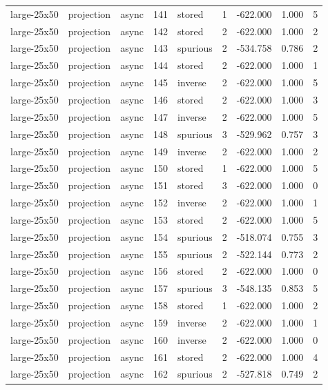 \begin{tabular}{lllrlrrrr}
large-25x50 & projection & async & 141 & stored & 1 & -622.000 & 1.000 & 5 \\
large-25x50 & projection & async & 142 & stored & 2 & -622.000 & 1.000 & 2 \\
large-25x50 & projection & async & 143 & spurious & 2 & -534.758 & 0.786 & 2 \\
large-25x50 & projection & async & 144 & stored & 2 & -622.000 & 1.000 & 1 \\
large-25x50 & projection & async & 145 & inverse & 2 & -622.000 & 1.000 & 5 \\
large-25x50 & projection & async & 146 & stored & 2 & -622.000 & 1.000 & 3 \\
large-25x50 & projection & async & 147 & inverse & 2 & -622.000 & 1.000 & 5 \\
large-25x50 & projection & async & 148 & spurious & 3 & -529.962 & 0.757 & 3 \\
large-25x50 & projection & async & 149 & inverse & 2 & -622.000 & 1.000 & 2 \\
large-25x50 & projection & async & 150 & stored & 1 & -622.000 & 1.000 & 5 \\
large-25x50 & projection & async & 151 & stored & 3 & -622.000 & 1.000 & 0 \\
large-25x50 & projection & async & 152 & inverse & 2 & -622.000 & 1.000 & 1 \\
large-25x50 & projection & async & 153 & stored & 2 & -622.000 & 1.000 & 5 \\
large-25x50 & projection & async & 154 & spurious & 2 & -518.074 & 0.755 & 3 \\
large-25x50 & projection & async & 155 & spurious & 2 & -522.144 & 0.773 & 2 \\
large-25x50 & projection & async & 156 & stored & 2 & -622.000 & 1.000 & 0 \\
large-25x50 & projection & async & 157 & spurious & 3 & -548.135 & 0.853 & 5 \\
large-25x50 & projection & async & 158 & stored & 1 & -622.000 & 1.000 & 2 \\
large-25x50 & projection & async & 159 & inverse & 2 & -622.000 & 1.000 & 1 \\
large-25x50 & projection & async & 160 & inverse & 2 & -622.000 & 1.000 & 0 \\
large-25x50 & projection & async & 161 & stored & 2 & -622.000 & 1.000 & 4 \\
large-25x50 & projection & async & 162 & spurious & 2 & -527.818 & 0.749 & 2 \\

\end{tabular}
